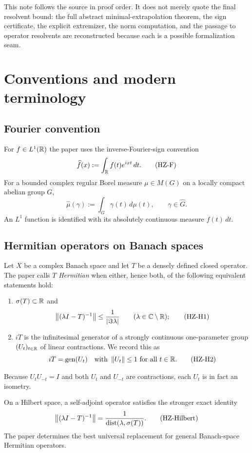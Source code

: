 This note follows the source in proof order. It does not merely quote the final resolvent bound: the full abstract minimal-extrapolation theorem, the sign certificate, the explicit extremizer, the norm computation, and the passage to operator resolvents are reconstructed because each is a possible formalization seam.

\section{Conventions and modern terminology}

\subsection{Fourier convention}

For $f\in L^1(\mathbb{R})$ the paper uses the inverse-Fourier-sign convention
\[
  \widehat f(x):=\int_{\mathbb{R}} f(t)e^{ixt}\,dt.
  \tag{HZ-F}\label{HZ-F}
\]
For a bounded complex regular Borel measure $\mu\in M(G)$ on a locally compact abelian group $G$,
\[
  \widehat\mu(\gamma):=\int_G \gamma(t)\,d\mu(t),
  \qquad \gamma\in\widehat G.
  \tag{HZ-M}\label{HZ-M}
\]
An $L^1$ function is identified with its absolutely continuous measure $f(t)\,dt$.

\subsection{Hermitian operators on Banach spaces}

Let $X$ be a complex Banach space and let $T$ be a densely defined closed operator. The paper calls $T$ \emph{Hermitian} when either, hence both, of the following equivalent statements hold:
\begin{enumerate}[label=(\roman*)]
\item $\sigma(T)\subset\mathbb{R}$ and
\[
  \left\lVert (\lambda I-T)^{-1}\right\rVert
  \le \frac{1}{\left\lvert \Im\lambda\right\rvert}
  \qquad(\lambda\in\mathbb{C}\setminus\mathbb{R});
  \tag{HZ-H1}\label{HZ-H1}
\]
\item $iT$ is the infinitesimal generator of a strongly continuous one-parameter group $(U_t)_{t\in\mathbb{R}}$ of linear contractions. We record this as
\[
  iT=\operatorname{gen}(U_t)
  \quad\text{with }\left\lVert U_t\right\rVert\le1\text{ for all }t\in\mathbb{R}.
  \tag{HZ-H2}\label{HZ-H2}
\]
\end{enumerate}
Because $U_tU_{-t}=I$ and both $U_t$ and $U_{-t}$ are contractions, each $U_t$ is in fact an isometry.

On a Hilbert space, a self-adjoint operator satisfies the stronger exact identity
\[
  \left\lVert (\lambda I-T)^{-1}\right\rVert
  =\frac{1}{\operatorname{dist}(\lambda,\sigma(T))}.
  \tag{HZ-Hilbert}\label{HZ-Hilbert}
\]
The paper determines the best universal replacement for general Banach-space Hermitian operators.

